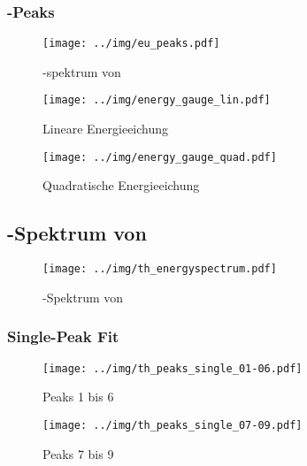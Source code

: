\subsubsection{\eu-Peaks}
\begin{figure}[H]
\begin{center}
  \texttt{[image: ../img/eu\_peaks.pdf]}
  \caption{\textgamma-spektrum von }
  \label{img:eu:peak}
\end{center}
\end{figure}

\begin{figure}[H]
\begin{center}
  \texttt{[image: ../img/energy\_gauge\_lin.pdf]}
  \caption{Lineare Energieeichung}
  \label{img:gauge:lin}
\end{center}
\end{figure}

\begin{figure}[H]
\begin{center}
  \texttt{[image: ../img/energy\_gauge\_quad.pdf]}
  \caption{Quadratische Energieeichung}
  \label{img:gauge:quad}
\end{center}
\end{figure}

\subsection{\textgamma-Spektrum von }
\begin{figure}[H]
\begin{center}
  \texttt{[image: ../img/th\_energyspectrum.pdf]}
  \caption{\textgamma-Spektrum von }
  \label{img:th:spectrum}
\end{center}
\end{figure}

\subsubsection{Single-Peak Fit} %
\begin{figure}[H]
\begin{center}
  \texttt{[image: ../img/th\_peaks\_single\_01-06.pdf]}
  \caption{Peaks 1 bis 6}
  \label{img:th:peaks:single:0106}
\end{center}
\end{figure}

\begin{figure}[H]
\begin{center}
  \texttt{[image: ../img/th\_peaks\_single\_07-09.pdf]}
  \caption{Peaks 7 bis 9}
  \label{img:th:peaks:single:0709}
\end{center}
\end{figure}

